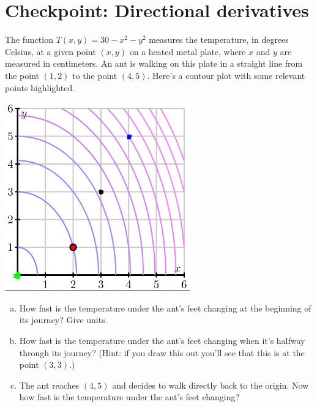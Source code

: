 


%


\allowdisplaybreaks
\section{Checkpoint: Directional derivatives}
The function $T(x,y) = 30 - x^2 - y^2$ measures the temperature, in degrees Celsius, at a given point $(x,y)$ on a heated metal plate, where $x$ and $y$ are measured in centimeters. An ant is walking on this plate in a straight line from the point $(1,2)$ to the point $(4,5)$. Here's a contour plot with some relevant points highlighted.

\includegraphics[width=0.6\textwidth]{../images/checkpoint-directional-derivatives.png}

\begin{enumerate}[(a)]
    \item How fast is the temperature under the ant's feet changing at the beginning of its journey? Give units.
    \item How fast is the temperature under the ant's feet changing when it's halfway through its journey? (Hint: if you draw this out you'll see that this is at the point $(3,3)$.)
    \item The ant reaches $(4,5)$ and decides to walk directly back to the origin. Now how fast is the temperature under the ant's feet changing?
\end{enumerate}
	

